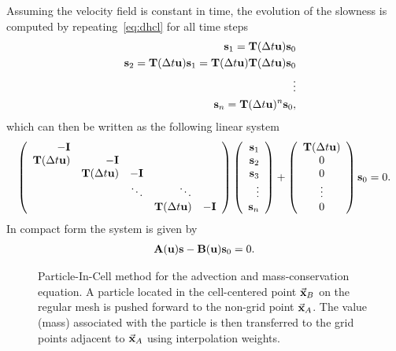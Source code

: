 \documentclass[english]{siamltex}
\newcommand {\bu}   { {\bf u} }          			%
\newcommand {\bfs}   { {\bf s} }
\newcommand {\bfu}   { {\bf u} }
\newcommand {\vx}    {\vec {\bf x}}
\newcommand{\bA}  { {\bf A} }      %
\newcommand{\bB}  { {\bf B} }      %
\newcommand{\bI}  { {\bf I} }      %
\newcommand{\bT}  {\text{{\bf T}}} %
\begin{document}
Assuming the velocity field is constant in time, the evolution of the slowness is computed by repeating~\eqref{eq:dhcl} for all time steps
\begin{eqnarray*}
&&\bfs_{1} = \bT(\Delta t\bu)\bfs_0\\
&&\bfs_{2} = \bT(\Delta t\bu)\bfs_1 = \bT(\Delta t\bu)\bT(\Delta t\bu)\bfs_0\\
&&{\vdots}\\
&&\bfs_{n} = \bT(\Delta t\bu)^n \bfs_0,
\end{eqnarray*}
which can then be written as the following linear system
\begin{equation}\label{eq:FlowSystem}
		\left( 
			\begin{array}{rrrrr}
				- \bI      &           &         &        &        \\
				  \bT(\Delta t\bu) & -\bI      &         &        &        \\
				           &  \bT(\Delta t\bu) & -\bI    &        &        \\
				           &           &  \ddots & \ddots &        \\
				           &           &         & \bT(\Delta t\bu)    & -\bI   \\
			\end{array}
		\right)
		\left(
			\begin{array}{r}
				\bfs_1 \\ \bfs_2 \\ \bfs_3 \\ \vdots \\ \bfs_n
			\end{array}
		\right)
	+
		\left(
			\begin{array}{c}
			\bT(\Delta t\bu) \\ 0  \\ 0\\ \vdots \\ 0
			\end{array}
		\right)
	\bfs_0
	= 0.
\end{equation}
In compact form the system is given by
\begin{eqnarray}
\label{hypde}
\bA(\bfu) \bfs - \bB(\bfu) \bfs_{0} = 0.
\end{eqnarray}



\begin{figure}
\begin{center}
			
\caption{Particle-In-Cell method for the advection and  mass-conservation equation.  A particle located in the cell-centered point $\vx_B$ on the regular mesh is pushed forward to the non-grid point $\vx_A$. The value (mass) associated with the particle is then transferred to the grid points adjacent to $\vx_A$ using interpolation weights.\label{figSL} }
\end{center}
\end{figure}
\end{document}

